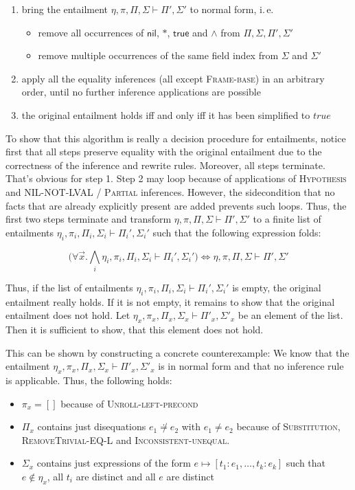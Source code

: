 \documentclass{scrartcl}
\theoremstyle{definition}
\newcommand{\nil}{{\textsf{nil}}}
\newcommand{\pftrue}{{\textsf{true}}}
\newcommand{\pfunequal}[2]{\ensuremath{#1 \not\doteq #2}}
\newcommand{\sfpointsto}[2]{#1 \mapsto [#2]}
\begin{document}
\begin{enumerate}
\item bring the entailment ${\eta,\pi,\Pi,\Sigma}\vdash{\Pi',\Sigma'}$ to
  normal form, i.\,e.\:
  \begin{itemize}
  \item remove all occurrences of $\nil$, $*$, $\pftrue$ and $\wedge$ from
    $\Pi, \Sigma, \Pi', \Sigma'$
  \item remove multiple occurrences of the same field index from $\Sigma$ and $\Sigma'$
  \end{itemize}
\item apply all the equality inferences (all except \textsc{Frame-base}) in an
  arbitrary order, until no further inference applications are possible
\item the original entailment holds iff and only iff it has been simplified to $\textit{true}$
\end{enumerate}

To show that this algorithm is really a decision procedure for entailments,
notice first that all steps preserve equality with the original entailment due
to the correctness of the inference and rewrite rules. Moreover, all steps
terminate. That's obvious for step 1. Step 2 may loop because of applications
of \textsc{Hypothesis} and \textsc{NIL-NOT-LVAL} / \textsc{Partial}
inferences. However, the sidecondition that no facts that are already
explicitly present are added prevents such loops.  Thus, the first two steps
terminate and transform ${\eta,\pi,\Pi,\Sigma}\vdash{\Pi',\Sigma'}$ to a
finite list of entailments
${\eta_i,\pi_i,\Pi_i,\Sigma_i}\vdash{\Pi_i',\Sigma_i'}$ such that the
following expression folds:

\[\big(\forall \vec{x}. \bigwedge_i
{\eta_i,\pi_i,\Pi_i,\Sigma_i}\vdash{\Pi_i',\Sigma_i'}\big) \Longleftrightarrow
{\eta,\pi,\Pi,\Sigma}\vdash{\Pi',\Sigma'}
\]


Thus, if the list of entailments
${\eta_i,\pi_i,\Pi_i,\Sigma_i}\vdash{\Pi_i',\Sigma_i'}$ is empty, the original
entailment really holds. If it is not empty, it remains to show that
the original entailment does not hold. Let
${\eta_x,\pi_x,\Pi_x,\Sigma_x}\vdash{\Pi'_x,\Sigma'_x}$ be an element of the
list. Then it is sufficient to show, that this element does not hold.

This can be shown by constructing a concrete counterexample: We know that the
entailment ${\eta_x,\pi_x,\Pi_x,\Sigma_x}\vdash{\Pi'_x,\Sigma'_x}$ is in
normal form and that no inference rule is applicable. Thus, the following
holds:
\begin{itemize}
\item $\pi_x = []$ because of \textsc{Unroll-left-precond}
\item $\Pi_x$ contains just disequations $\pfunequal {e_1} {e_2}$ with $e_1
  \not = e_2$ because of \textsc{Substitution}, \textsc{RemoveTrivial-EQ-L} and \textsc{Inconsistent-unequal}.
\item $\Sigma_x$ contains just expressions of the form $\sfpointsto e
  {t_1:e_1, \ldots, t_k:e_k}$ such that $e \not\in \eta_x$, all $t_i$ are
  distinct and all $e$ are distinct
\end{itemize}
\end{document}
